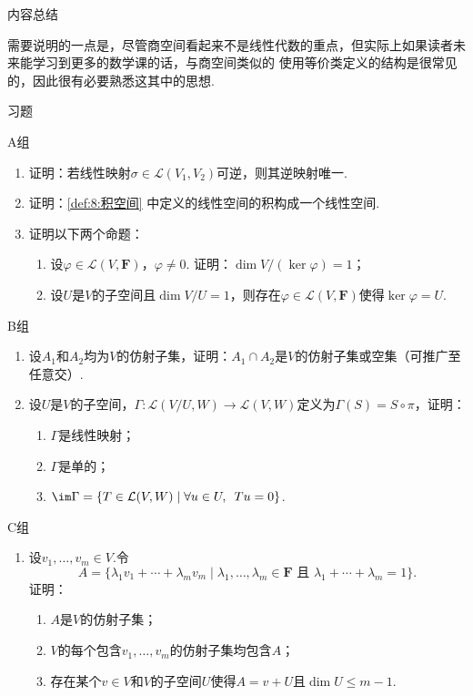 \vspace{2ex}
\centerline{\heiti \Large 内容总结}

需要说明的一点是，尽管商空间看起来不是线性代数的重点，但实际上如果读者未来能学习到更多的数学课的话，与商空间类似的
使用等价类定义的结构是很常见的，因此很有必要熟悉这其中的思想.

\vspace{2ex}

\centerline{\heiti \Large 习题}
\vspace{2ex}
{\kaishu }
\begin{flushright}
    \kaishu

\end{flushright}
\centerline{\heiti A组}
\begin{enumerate}
    \item 证明：若线性映射$\sigma \in \mathcal{L}(V_1,V_2)$可逆，则其逆映射唯一.
    \item 证明：\autoref{def:8:积空间} 中定义的线性空间的积构成一个线性空间.
    \item 证明以下两个命题：
    \begin{enumerate}[label=(\arabic*)]
        \item 设$\varphi\in \mathcal{L}(V,\mathbf{F})$，$\varphi\neq 0$. 证明：$\dim V/(\ker\varphi)=1$；
        \item 设$U$是$V$的子空间且$\dim V/U=1$，则存在$\varphi\in \mathcal{L}(V,\mathbf{F})$使得$\ker\varphi=U$.
    \end{enumerate}
\end{enumerate}
\centerline{\heiti B组}
\begin{enumerate}
    \item 设$A_1$和$A_2$均为$V$的仿射子集，证明：$A_1\cap A_2$是$V$的仿射子集或空集（可推广至任意交）.
    \item 设$U$是$V$的子空间，$\Gamma:\mathcal{L}(V/U,W)\to \mathcal{L}(V,W)$定义为$\Gamma(S)=S\circ\pi$，证明：
    \begin{enumerate}[label=(\arabic*)]
        \item $\Gamma$是线性映射；
        \item $\Gamma$是单的；
        \item $\im\Gamma=\{T\in \mathcal{L}(V,W) \mid \forall u\in U,\enspace Tu=0\}$.
    \end{enumerate}
\end{enumerate}
\centerline{\heiti C组}
\begin{enumerate}
    \item 设$v_1,\ldots,v_m\in V$.令
    \[A=\{\lambda_1v_1+\cdots+\lambda_mv_m \mid \lambda_1,\ldots,\lambda_m\in\mathbf{F}\text{~且~}\lambda_1+\cdots+\lambda_m=1\}.\]
    证明：
    \begin{enumerate}[label=(\arabic*)]
        \item $A$是$V$的仿射子集；
        \item $V$的每个包含$v_1,\ldots,v_m$的仿射子集均包含$A$；
        \item 存在某个$v\in V$和$V$的子空间$U$使得$A=v+U$且$\dim U\le m-1$.
    \end{enumerate}
\end{enumerate}
